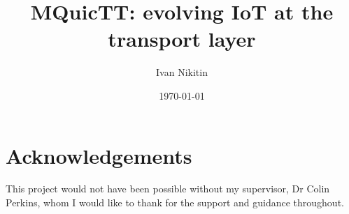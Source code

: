 \documentclass{l4proj}
\begin{document}
\makeatletter
\patchcmd{\NAT@test}{\else \NAT@nm}{\else \NAT@nmfmt{\NAT@nm}}{}{}

\DeclareRobustCommand\citepos
{\begingroup
    \let\NAT@nmfmt\NAT@posfmt
    \NAT@swafalse\let\NAT@ctype\z@\NAT@partrue
    \@ifstar{\NAT@fulltrue\NAT@citetp}{\NAT@fullfalse\NAT@citetp}}

\let\NAT@orig@nmfmt\NAT@nmfmt
\def\NAT@posfmt#1{
    \StrRemoveBraces{#1}[\NAT@temp]
    \IfEndWith{\NAT@temp}{s}
    {\NAT@orig@nmfmt{#1'}}
    {\NAT@orig@nmfmt{#1's}}}

\makeatother

\title{MQuicTT: evolving IoT at the transport layer}
\author{Ivan Nikitin}
\date{\today}

\maketitle



\chapter*{Acknowledgements}

This project would not have been possible without my supervisor, Dr Colin Perkins, whom I would like to thank for the support and guidance throughout.

\def\consentname {Ivan Nikitin} %
\def\consentdate {\today} %
\educationalconsent


\tableofcontents







\begin{appendices}
    
    
\end{appendices}


\end{document}
